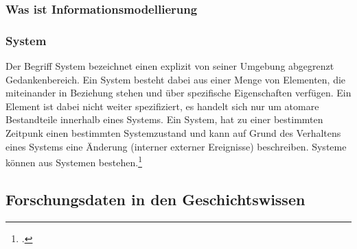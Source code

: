 \documentclass[12pt,a4paper]{article}
\begin{document}
\subsubsection{Was ist Informationsmodellierung}

\subsubsection{System}

Der Begriff System bezeichnet einen explizit von seiner Umgebung abgegrenzt Gedankenbereich. Ein System besteht dabei aus einer Menge von Elementen, die miteinander in Beziehung stehen und über spezifische Eigenschaften verfügen. Ein Element ist dabei nicht weiter spezifiziert, es handelt sich nur um atomare Bestandteile innerhalb eines Systems. Ein System, hat zu einer bestimmten Zeitpunk einen bestimmten Systemzustand und kann auf Grund des Verhaltens eines Systems eine Änderung (interner externer Ereignisse) beschreiben. Systeme können aus Systemen bestehen.\footcite[][S.52-53]{kobler2010qualitat}

\subsection{Forschungsdaten in den Geschichtswissen}
\end{document}
